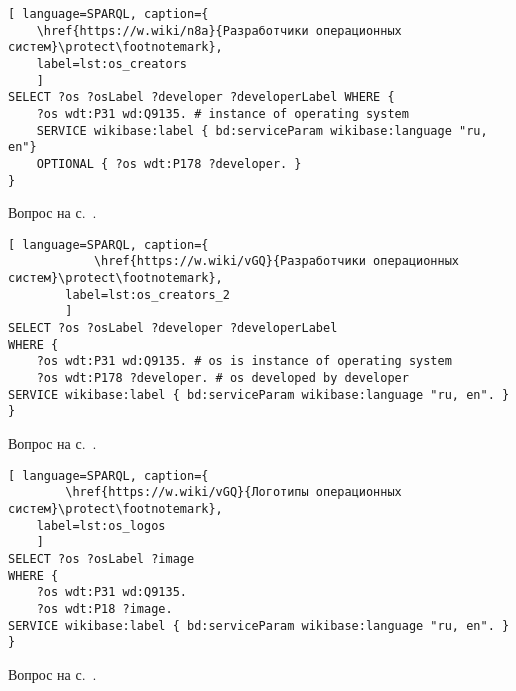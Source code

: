 \begin{task}
	\label{answer:what_system_created}

	\begin{lstlisting}[ language=SPARQL, caption={
	\href{https://w.wiki/n8a}{Разработчики операционных систем}\protect\footnotemark},
	label=lst:os_creators
	]
SELECT ?os ?osLabel ?developer ?developerLabel WHERE {
	?os wdt:P31 wd:Q9135. # instance of operating system
	SERVICE wikibase:label { bd:serviceParam wikibase:language "ru, en"}
	OPTIONAL { ?os wdt:P178 ?developer. }
}
	\end{lstlisting}

	\small{Вопрос на с.~\pageref{lst:inception_time_of_operating_systems}.}
\end{task}

\begin{task}
	\label{answer:os_and_developers}

	\begin{lstlisting}[ language=SPARQL, caption={
			\href{https://w.wiki/vGQ}{Разработчики операционных систем}\protect\footnotemark},
		label=lst:os_creators_2
		]
SELECT ?os ?osLabel ?developer ?developerLabel
WHERE {
	?os wdt:P31 wd:Q9135. # os is instance of operating system
	?os wdt:P178 ?developer. # os developed by developer
SERVICE wikibase:label { bd:serviceParam wikibase:language "ru, en". }
}
	\end{lstlisting}

	\small{Вопрос на с.~\pageref{tasks:operating_system_tasks}.}
\end{task}

\begin{task}
\label{answer:os_and_logos}

\begin{lstlisting}[ language=SPARQL, caption={
		\href{https://w.wiki/vGQ}{Логотипы операционных систем}\protect\footnotemark},
	label=lst:os_logos
	]
SELECT ?os ?osLabel ?image
WHERE {
	?os wdt:P31 wd:Q9135.
	?os wdt:P18 ?image.
SERVICE wikibase:label { bd:serviceParam wikibase:language "ru, en". }
}
\end{lstlisting}

\small{Вопрос на с.~\pageref{tasks:operating_system_tasks}.}
\end{task}

